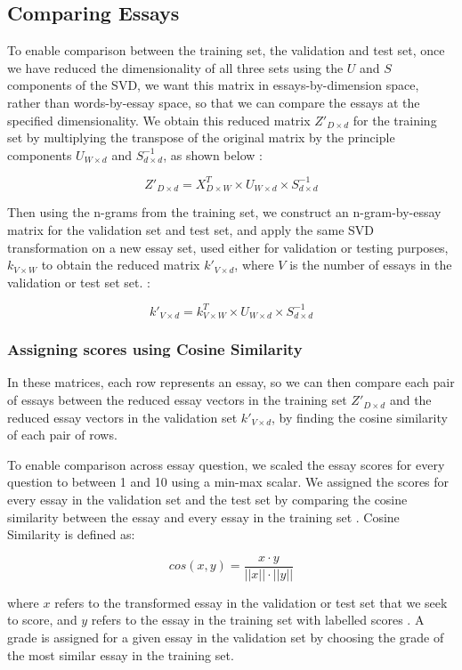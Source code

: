 \documentclass[10pt,letterpaper]{article}
\begin{document}
\subsection{Comparing Essays}

To enable comparison between the training set, the validation and test set, once we have reduced the dimensionality of all three sets using the $U$ and $S$ components of the SVD, we want this matrix in essays-by-dimension space, rather than words-by-essay space, so that we can compare the essays at the specified dimensionality. We obtain this reduced matrix $Z'_{D\times d}$ for the training set by multiplying the transpose of the original matrix by the principle components $U_{W\times d}$ and $ S^{-1}_{d \times d}$, as shown below \cite{islam2010automated}:

$$Z'_{D\times d} = X^T_{D\times W} \times U_{W\times d} \times S^{-1}_{d \times d}$$

Then using the n-grams from the training set, we construct an n-gram-by-essay matrix for the validation set and test set, and apply the same SVD transformation on a new essay set, used either for validation or testing purposes, $k_{V \times W}$ to obtain the reduced matrix $k'_{V \times d}$, where $V$ is the number of essays in the validation or test set set. \cite{islam2010automated}:

$$k'_{V \times d} = k^T_{V \times W} \times U_{W\times d} \times S^{-1}_{d \times d}$$

\subsubsection{Assigning scores using Cosine Similarity}
In these matrices, each row represents an essay, so we can then compare each pair of essays between the reduced essay vectors in the training set $Z'_{D\times d}$ and the reduced essay vectors in the validation set $k'_{V \times d}$, by finding the cosine similarity of each pair of rows. 

To enable comparison across essay question, we scaled the essay scores for every question to between 1 and 10 using a min-max scalar. We assigned the scores for every essay in the validation set and the test set by comparing the cosine similarity between the essay and every essay in the training set \cite{islam2010automated}. Cosine Similarity is defined as:

$$cos(x, y) = \frac {x \cdot y}{||x|| \cdot ||y||}$$

where $x$ refers to the transformed essay in the validation or test set that we seek to score, and $y$ refers to the essay in the training set with labelled scores \cite{islam2010automated}. A grade is assigned for a given essay in the validation set by choosing the grade of the most similar essay in the training set.
\end{document}
